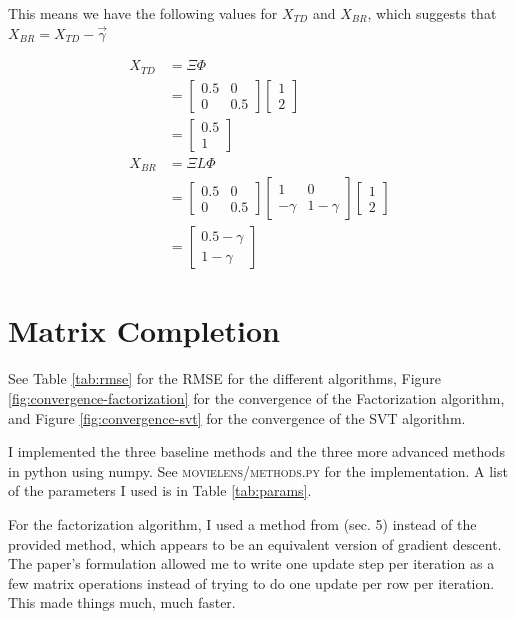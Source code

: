 \documentclass{article}
\begin{document}
This means we have the following values for $X_{TD}$ and $X_{BR}$, which suggests that $X_{BR} = X_{TD} - \vec{\gamma}$

\begin{align}
  X_{TD} &= \Xi\Phi \\
  &= \begin{bmatrix}
    0.5 & 0 \\
    0 & 0.5
  \end{bmatrix} \begin{bmatrix}
    1 \\
    2
  \end{bmatrix} \\
  &= \begin{bmatrix}
    0.5 \\
    1
  \end{bmatrix} \\
  X_{BR} &= \Xi L \Phi \\
  &= \begin{bmatrix}
    0.5 & 0 \\
    0 & 0.5
  \end{bmatrix} \begin{bmatrix}
    1 & 0 \\
    -\gamma & 1-\gamma
  \end{bmatrix} \begin{bmatrix}
    1 \\
    2
  \end{bmatrix} \\
  &= \begin{bmatrix}
    0.5 - \gamma \\
    1 - \gamma
  \end{bmatrix}
\end{align}

\section{Matrix Completion}

See Table \ref{tab:rmse} for the RMSE for the different algorithms, Figure \ref{fig:convergence-factorization} for the convergence of the Factorization algorithm, and Figure \ref{fig:convergence-svt} for the convergence of the SVT algorithm.

I implemented the three baseline methods and the three more advanced methods in python using numpy. See \textsc{movielens/methods.py} for the implementation. A list of the parameters I used is in Table \ref{tab:params}.

For the factorization algorithm, I used a method from \cite{algorithmsNMF} (sec. 5) instead of the provided method, which appears to be an equivalent version of gradient descent. The paper's formulation allowed me to write one update step per iteration as a few matrix operations instead of trying to do one update per row per iteration. This made things much, much faster.
\end{document}
